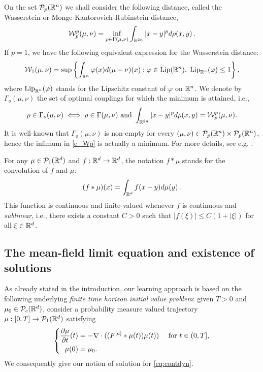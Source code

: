 On the set $\mathcal{P}_p(\mathbb{R}^n)$ we shall consider the following distance, called the Wasserstein or Monge-Kantorovich-Rubinstein distance,
\begin{align}  \label{e_Wp}
\mathcal{W}^p_p(\mu,\nu)=\inf_{\rho \in \Gamma(\mu,\nu)} \int_{\mathbb{R}^{2n}} |x-y|^p d \rho(x,y)\,.
\end{align}
If $p = 1$, we have the following equivalent expression for the Wasserstein distance:
\begin{align*}
\mathcal{W}_1(\mu,\nu)=\sup \left \{ \int_{\mathbb{R}^n} \varphi(x) d (\mu-\nu)(x)  : \varphi \in \textup{Lip}(\mathbb{R}^n), \; \textup{Lip}_{\mathbb{R}^n}(\varphi) \leq 1 \right \},
\end{align*}
where $\textup{Lip}_{\mathbb{R}^n}(\varphi)$ stands for the Lipschitz constant of $\varphi$ on $\mathbb{R}^n$. We denote by $\Gamma_o(\mu,\nu)$ the set of optimal couplings for which the minimum is attained, i.e.,
\begin{align*}
\rho \in \Gamma_o(\mu, \nu) \iff \rho \in \Gamma(\mu, \nu) \text{ and } \int_{\mathbb{R}^{2n}} | x - y |^p d \rho(x,y) = \mathcal{W}^p_p(\mu,\nu).
\end{align*}
It is well-known that $\Gamma_o(\mu, \nu)$ is non-empty for every $(\mu,\nu) \in \mathcal{P}_p(\mathbb{R}^n)\times\mathcal{P}_p(\mathbb{R}^n)$, hence the infimum in \eqref{e_Wp} is actually a minimum. For more details, see e.g. \cite{AGS,villani}.

For any $\mu \in \mathcal{P}_1(\mathbb{R}^d)$ and $f: \mathbb{R}^d \to \mathbb{R}^d$, the notation $f * \mu$ stands for the convolution of $f$ and $\mu$:
\begin{align*}
(f * \mu)(x) = \int_{\mathbb{R}^d} f(x-y) d\mu(y)\,.
\end{align*}
This function is continuous and finite-valued whenever $f$ is continuous and \emph{sublinear}, i.e., there exists a constant $C > 0$ such that $| f(\xi) | \leq C (1 + |\xi|)$ for all $\xi \in \mathbb{R}^d$.

\subsection{The mean-field limit equation and existence of solutions}

As already stated in the introduction, our learning approach is based on the following underlying \textit{finite time horizon initial value problem}: given $T > 0$ and $\mu_0 \in \mathcal{P}_c(\mathbb{R}^d)$, consider a probability measure valued trajectory $\mu:[0,T]\rightarrow \mathcal{P}_1(\mathbb{R}^d)$ satisfying 
\begin{align}\label{eq:contdyn}
\left\{\begin{aligned}
\frac{\partial \mu}{\partial t}(t) &= -\nabla \cdot ((F^{[a]}*\mu(t))\mu(t)) \quad \text{ for } t \in (0,T],\\
\mu(0) &=\mu_0.
\end{aligned}\right.
\end{align}
We consequently give our notion of solution for \eqref{eq:contdyn}.

